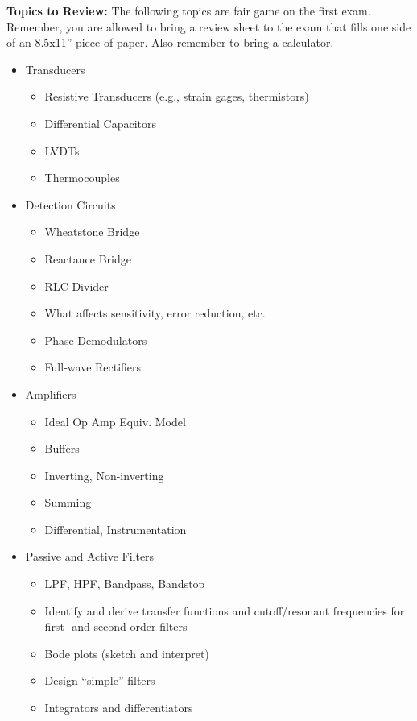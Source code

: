 \documentclass[10pt]{report}
\begin{document}
{\bf Topics to Review:} The following topics are fair game on the first exam.
Remember, you are allowed to bring a review sheet to the exam that fills one
side of an 8.5x11'' piece of paper.  Also remember to bring a calculator.

\begin{itemize}

\item Transducers
\begin{itemize}
    \item Resistive Transducers (e.g., strain gages, thermistors)
    \item Differential Capacitors
    \item LVDTs
    \item Thermocouples
\end{itemize}

\item Detection Circuits
\begin{itemize}
    \item Wheatstone Bridge
    \item Reactance Bridge
    \item RLC Divider
    \item What affects sensitivity, error reduction, etc.
    \item Phase Demodulators
    \item Full-wave Rectifiers
\end{itemize}

\item Amplifiers
\begin{itemize}
    \item Ideal Op Amp Equiv. Model
    \item Buffers
    \item Inverting, Non-inverting
    \item Summing
    \item Differential, Instrumentation
\end{itemize}

\item Passive and Active Filters
\begin{itemize}
    \item LPF, HPF, Bandpass, Bandstop
    \item Identify and derive transfer functions and cutoff/resonant frequencies for first- and second-order filters
    \item Bode plots (sketch and interpret)
    \item Design ``simple'' filters
    \item Integrators and differentiators
\end{itemize}


\end{itemize}
\end{document}
